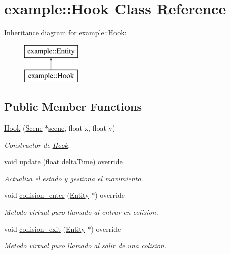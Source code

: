 \hypertarget{classexample_1_1_hook}{}\section{example\+::Hook Class Reference}
\label{classexample_1_1_hook}
Inheritance diagram for example\+::Hook\+:\begin{figure}[H]
\begin{center}
\leavevmode
\includegraphics[height=2.000000cm]{classexample_1_1_hook}
\end{center}
\end{figure}
\subsection*{Public Member Functions}
\begin{DoxyCompactItemize}
\item 
\mbox{\hyperlink{classexample_1_1_hook_a0e6c26e988930a4c27ffca4999f78d3f}{Hook}} (\mbox{\hyperlink{classexample_1_1_scene}{Scene}} $\ast$\mbox{\hyperlink{classexample_1_1_entity_ab851dbde4a16829f9fb77ab9a66b9f1e}{scene}}, float x, float y)
\begin{DoxyCompactList}\small\item\em Constructor de \mbox{\hyperlink{classexample_1_1_hook}{Hook}}. \end{DoxyCompactList}\item 
void \mbox{\hyperlink{classexample_1_1_hook_a23c335b2ccc707a1444109a849d8020e}{update}} (float delta\+Time) override
\begin{DoxyCompactList}\small\item\em Actualiza el estado y gestiona el movimiento. \end{DoxyCompactList}\item 
void \mbox{\hyperlink{classexample_1_1_hook_a44bba68a70104e45a890311d5edd91a0}{collision\+\_\+enter}} (\mbox{\hyperlink{classexample_1_1_entity}{Entity}} $\ast$) override
\begin{DoxyCompactList}\small\item\em Metodo virtual puro llamado al entrar en colision. \end{DoxyCompactList}\item 
void \mbox{\hyperlink{classexample_1_1_hook_a329b5437b6a05c621b8d0be35e326bb5}{collision\+\_\+exit}} (\mbox{\hyperlink{classexample_1_1_entity}{Entity}} $\ast$) override
\begin{DoxyCompactList}\small\item\em Metodo virtual puro llamado al salir de una colision. \end{DoxyCompactList}\end{DoxyCompactItemize}
